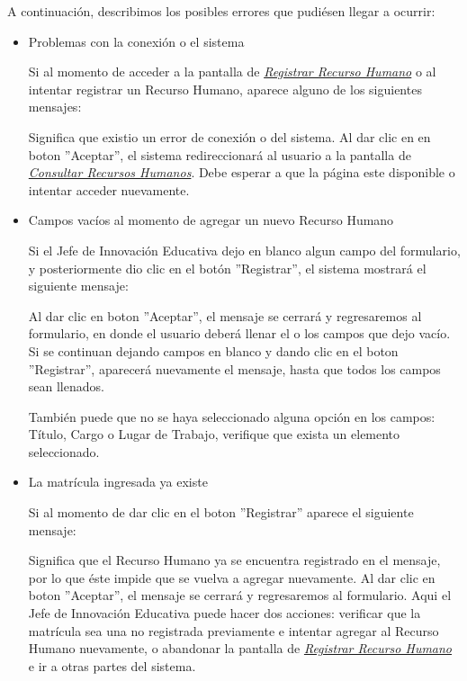 A continuación, describimos los posibles errores que pudiésen llegar a ocurrir:

\begin{itemize}
	\item Problemas con la conexión o el sistema

	Si al momento de acceder a la pantalla de \hyperlink{registrarrh}{\textit{Registrar Recurso Humano}} o al intentar registrar un Recurso Humano, aparece alguno de los siguientes mensajes:

	Significa que existio un error de conexión o del sistema. Al dar clic en en boton ''Aceptar'', el sistema redireccionará al usuario a la pantalla de \hyperlink{consultarrh}{\textit{Consultar Recursos Humanos}}. Debe esperar a que la página este disponible o intentar acceder nuevamente.

	\item Campos vacíos al momento de agregar un nuevo Recurso Humano

	Si el Jefe de Innovación Educativa dejo en blanco algun campo del formulario, y posteriormente dio clic en el botón ''Registrar'', el sistema mostrará el siguiente mensaje:

	Al dar clic en boton ''Aceptar'', el mensaje se cerrará y regresaremos al formulario, en donde el usuario deberá llenar el o los campos que dejo vacío. Si se continuan dejando campos en blanco y dando clic en el boton ''Registrar'', aparecerá nuevamente el mensaje, hasta que todos los campos sean llenados.

	También puede que no se haya seleccionado alguna opción en los campos: Título, Cargo o Lugar de Trabajo, verifique que exista un elemento seleccionado.

	\item La matrícula ingresada ya existe

	Si al momento de dar clic en el boton ''Registrar'' aparece el siguiente mensaje:

	Significa que el Recurso Humano ya se encuentra registrado en el mensaje, por lo que éste impide que se vuelva a agregar nuevamente. Al dar clic en boton ''Aceptar'', el mensaje se cerrará y regresaremos al formulario. Aqui el Jefe de Innovación Educativa puede hacer dos acciones: verificar que la matrícula sea una no registrada previamente e intentar agregar al Recurso Humano nuevamente, o abandonar la pantalla de \hyperlink{registrarrh}{\textit{Registrar Recurso Humano}} e ir a otras partes del sistema.


\end{itemize}
